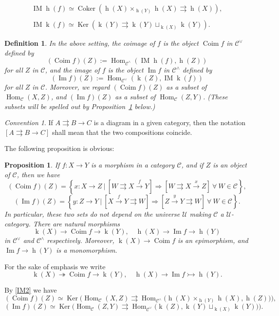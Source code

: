 \documentclass[12pt]{article}%
\newtheorem{prop}[thm]{Proposition}
\newtheorem{df}[thm]{Definition}%
\theoremstyle{remark}
\newtheorem{conv}[thm]{Convention}%
\theoremstyle{definition}
\newcommand{\C}{\mathcal C}
\newcommand{\U}{\mathcal U}
\newcommand{\epi}{\twoheadrightarrow}
\newcommand{\mono}{\rightarrowtail}%
\newcommand{\parar}{\rightrightarrows}
\newcommand{\then}{\Rightarrow}
\newcommand{\xr}{\xrightarrow}
\DeclareMathOperator{\Coim}{Coim}
\DeclareMathOperator{\Coker}{Coker}
\DeclareMathOperator{\Ima}{Im}
\DeclareMathOperator{\IM}{IM}
\DeclareMathOperator{\hy}{h}
\DeclareMathOperator{\ky}{k}
\DeclareMathOperator{\Hom}{Hom}%
\DeclareMathOperator{\Ker}{Ker}
\begin{document}
\begin{equation}\label{IM2}
\begin{split}
\IM\hy(f)\simeq\Coker(\hy(X)\times_{\hy(Y)}\hy(X)\parar\hy(X)),\\ \\ 
\IM\ky(f)\simeq\Ker(\ky(Y)\parar\ky(Y)\sqcup_{\ky(X)}\ky(Y)).
\end{split}
\end{equation}

\begin{df}\label{dci}
In the above setting, the {\em coimage}  of $f$ is the object $\Coim f$ in $\C^\vee$ defined by 
$$ 
(\Coim f)(Z):=\Hom_{\C^\wedge}(\IM\hy(f),\hy(Z))
$$ 
for all $Z$ in $\C$, and the {\em image}  of $f$ is the object $\Ima f$ in $\C^\wedge$ defined by 
$$ 
(\Ima f)(Z):=\Hom_{\C^\vee}(\ky(Z),\IM\ky(f)) 
$$ 
for all $Z$ in $\C$. Moreover, we regard $(\Coim f)(Z)$ as a subset of $\Hom_\C(X,Z)$, and $(\Ima f)(Z)$ as a subset of $\Hom_\C(Z,Y)$. (These subsets will be spelled out by Proposition~\ref{epimono} below.)
\end{df} 

\begin{conv}\label{bra}
If $A\parar B\to C$ is a diagram in a given category, then the notation $[A\parar B\to C]$ shall mean that the two compositions coincide.
\end{conv}

The following proposition is obvious:

\begin{prop}\label{epimono}
If $f:X\to Y$ is a morphism in a category $\C$, and if $Z$ is an object of $\C$, then we have 
$$
(\Coim f)(Z)=\left\{x:X\to Z\ \bigg|\ \left[W\parar X\xr fY\right]\then\left[W\parar X\xr xZ\right]\ \forall\ W\in\C\right\},
$$
$$
(\Ima f)(Z)=\left\{y:Z\to Y\ \bigg|\ \left[X\xr fY\parar W\right]\then\left[Z\xr yY\parar W\right]\ \forall\ W\in\C\right\}.
$$ 
In particular, these two sets do not depend on the universe $\U$ making $\C$ a $\U$\--category. There are natural morphisms 
$$
\ky(X)\to\Coim f\to\ky(Y),\quad\hy(X)\to\Ima f\to\hy(Y)
$$ 
in $\C^\vee$ and $\C^\wedge$ respectively. Moreover, $\ky(X)\to\Coim f$ is an epimorphism, and $\Ima f\to\hy(Y)$ is a monomorphism. 
\end{prop} 

For the sake of emphasis we write
$$
\ky(X)\epi\Coim f\to\ky(Y),\quad\hy(X)\to\Ima f\mono\hy(Y).
$$ 

By \eqref{IM2} we have 
$$ 
(\Coim f)(Z)\simeq\Ker\Big(\Hom_\C(X,Z)\parar\Hom_{\C^\wedge}\big(\hy(X)\times_{\hy(Y)}\hy(X),\hy(Z)\big)\Big), 
$$ 
$$ 
(\Ima f)(Z)\simeq\Ker\Big(\Hom_\C(Z,Y)\parar\Hom_{\C^\vee}\big(\ky(Z),\ky(Y)\sqcup_{\ky(X)}\ky(Y)\big)\Big). 
$$
 
\end{document}
